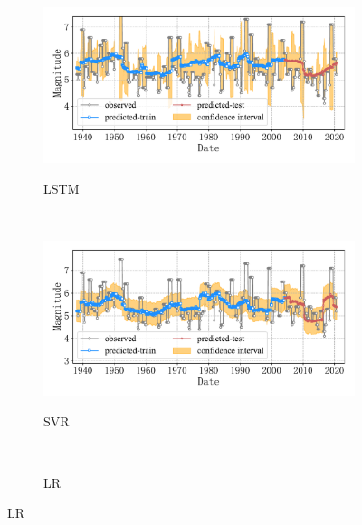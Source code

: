 \begin{figure}[!htbp]
  \centering
  \begin{subfigure}[b]{0.45\textwidth}
    \caption{LSTM}
    \includegraphics[width=\textwidth]{Img/chap5_seism/total/seism_lstm_minyear_1932_maxyear_2021_spanlat_2_spanlon_4_timewindow_72_nextmonth_12_minmag_3.0_blocks1.pdf}
    \vspace{-1cm}
    \label{fig:seism_lstm_minyear_1932_maxyear_2021_spanlat_2_spanlon_4_timewindow_72_nextmonth_12_minmag_3.0_blocks1}
  \end{subfigure}
  ~
  \begin{subfigure}[b]{0.45\textwidth}
    \caption{SVR} 
    \includegraphics[width=\textwidth]{Img/chap5_seism/total/seism_svr_minyear_1932_maxyear_2021_spanlat_2_spanlon_4_timewindow_72_nextmonth_12_minmag_3.0_blocks1.pdf}
    \vspace{-1cm}
    \label{fig:seism_svr_minyear_1932_maxyear_2021_spanlat_2_spanlon_4_timewindow_72_nextmonth_12_minmag_3.0_blocks1}
  \end{subfigure}   
  \\
  \begin{subfigure}[b]{0.45\textwidth}
      \caption{LR}
      \vspace{-0.2cm}

\end{subfigure}
\end{figure}
